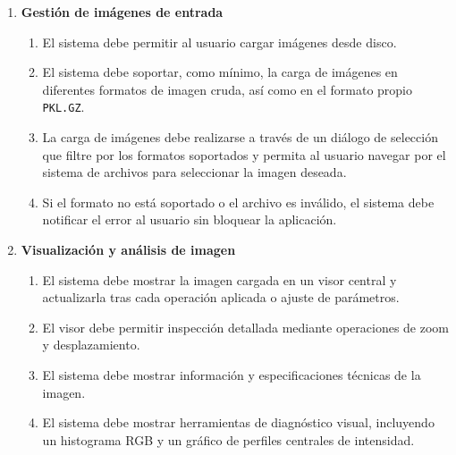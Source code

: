 \begin{enumerate}
	\item \textbf{Gestión de imágenes de entrada}\label{req:rf-1}
	\begin{enumerate}
		\item[1.1.] El sistema debe permitir al usuario cargar imágenes desde disco.\label{req:rf-1-1}
		\item[1.2.] El sistema debe soportar, como mínimo, la carga de imágenes en diferentes formatos de imagen cruda, así como en el formato propio \texttt{PKL.GZ}.\label{req:rf-1-2}
		\item[1.3.] La carga de imágenes debe realizarse a través de un diálogo de selección que filtre por los formatos soportados y permita al usuario navegar por el sistema de archivos para seleccionar la imagen deseada.\label{req:rf-1-3} 
		\item[1.4.] Si el formato no está soportado o el archivo es inválido, el sistema debe notificar el error al usuario sin bloquear la aplicación.\label{req:rf-1-4}
	\end{enumerate}

	\vspace{0.5em}

	\item \textbf{Visualización y análisis de imagen}\label{req:rf-2}
	\begin{enumerate}
		\item[2.1.] El sistema debe mostrar la imagen cargada en un visor central y actualizarla tras cada operación aplicada o ajuste de parámetros.\label{req:rf-2-1}
		\item[2.2.] El visor debe permitir inspección detallada mediante operaciones de zoom y desplazamiento.\label{req:rf-2-2}
		\item[2.3.] El sistema debe mostrar información y especificaciones técnicas de la imagen.\label{req:rf-2-3}
		\item[2.4.] El sistema debe mostrar herramientas de diagnóstico visual, incluyendo un histograma RGB y un gráfico de perfiles centrales de intensidad.\label{req:rf-2-4}
	\end{enumerate}

	\newpage


\end{enumerate}

